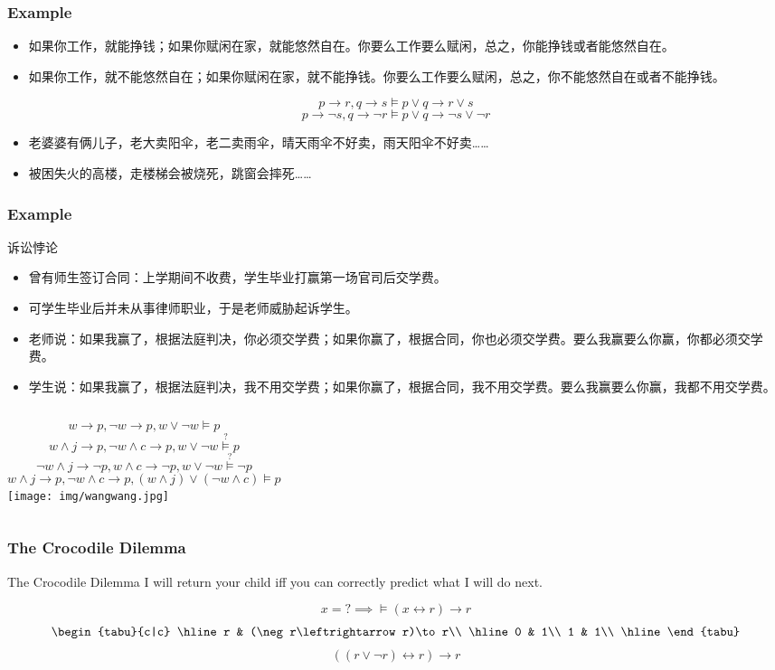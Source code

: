 \documentclass[UTF8,11pt,colorlinks,compress,openany]{beamer}%
\begin{document}
\begin{frame}\frametitle{Example}
	\begin{block}{}
	\begin{itemize}
		\item 如果你工作，就能挣钱；如果你赋闲在家，就能悠然自在。你要么工作要么赋闲，总之，你能挣钱或者能悠然自在。
		\item 如果你工作，就不能悠然自在；如果你赋闲在家，就不能挣钱。你要么工作要么赋闲，总之，你不能悠然自在或者不能挣钱。
	\end{itemize}
	\end{block}
	\[p\to r, q\to s\vDash p\vee q\to r\vee s\]
	\[p\to\neg s, q\to\neg r\vDash p\vee q\to\neg s\vee\neg r\]
\begin{itemize}
	\item 老婆婆有俩儿子，老大卖阳伞，老二卖雨伞，晴天雨伞不好卖，雨天阳伞不好卖……
	\item 被困失火的高楼，走楼梯会被烧死，跳窗会摔死……
\end{itemize}
\end{frame}

\begin{frame}\frametitle{Example}
	\begin{block}{诉讼悖论}\small
		\begin{itemize}
			\item 曾有师生签订合同：上学期间不收费，学生毕业打赢第一场官司后交学费。
			\item 可学生毕业后并未从事律师职业，于是老师威胁起诉学生。
			\item 老师说：如果我赢了，根据法庭判决，你必须交学费；如果你赢了，根据合同，你也必须交学费。要么我赢要么你赢，你都必须交学费。
			\item 学生说：如果我赢了，根据法庭判决，我不用交学费；如果你赢了，根据合同，我不用交学费。要么我赢要么你赢，我都不用交学费。
		\end{itemize}
	\end{block}
\begin{columns}
	\[w\to p, \neg w\to p, w\vee\neg w\vDash p\]
	\[w\wedge j\to p, \neg w\wedge c\to p, w\vee\neg w\stackrel{?}{\vDash} p\]
	\[\neg w\wedge j\to\neg p, w\wedge c\to\neg p, w\vee\neg w\stackrel{?}{\vDash}\neg p\]
	\[w\wedge j\to p, \neg w\wedge c\to p, (w\wedge j)\vee(\neg w\wedge c)\vDash p\]
\texttt{[image: img/wangwang.jpg]}
\end{columns}
\end{frame}

\begin{frame}\frametitle{The Crocodile Dilemma}
	\begin{block}{The Crocodile Dilemma}
		I will return your child iff you can correctly predict what I will do next.
	\end{block}
	\[x=?\implies \vDash(x\leftrightarrow r)\to r\]
	\[
		\begin{tabu}{c|c}
		\hline
		r & (\neg r\leftrightarrow r)\to r\\
		\hline
		0 & 1\\
		1 & 1\\
		\hline
		\end{tabu}
	\]
	\[((r\vee\neg r)\leftrightarrow r)\to r\]
\end{frame}
\end{document}
